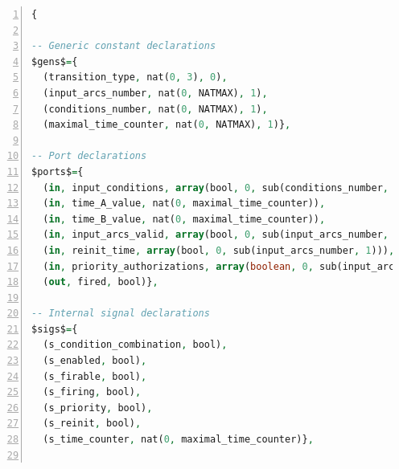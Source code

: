 \documentclass[pdflatex,sn-mathphys]{sn-jnl}%
\theoremstyle{thmstyleone}%
\theoremstyle{thmstyletwo}%
\theoremstyle{thmstylethree}%
\begin{document}
\begin{appendices}
\begin{lstlisting}[language=VHDL,
label={lst:trans-design-abss},
caption={The \texttt{transition} design in \hvhdl{} abstract syntax.},
framexleftmargin=1.5em,
xleftmargin=2em,
numbers=left,
numberstyle=\tiny\ttfamily,
basicstyle=\fontsize{8}{10}\selectfont]
{

-- Generic constant declarations
$gens$={
  (transition_type, nat(0, 3), 0),
  (input_arcs_number, nat(0, NATMAX), 1),
  (conditions_number, nat(0, NATMAX), 1),
  (maximal_time_counter, nat(0, NATMAX), 1)},

-- Port declarations
$ports$={
  (in, input_conditions, array(bool, 0, sub(conditions_number, 1)),
  (in, time_A_value, nat(0, maximal_time_counter)),
  (in, time_B_value, nat(0, maximal_time_counter)),
  (in, input_arcs_valid, array(bool, 0, sub(input_arcs_number, 1))),
  (in, reinit_time, array(bool, 0, sub(input_arcs_number, 1))),
  (in, priority_authorizations, array(boolean, 0, sub(input_arcs_number, 1))),
  (out, fired, bool)},

-- Internal signal declarations
$sigs$={
  (s_condition_combination, bool),
  (s_enabled, bool),
  (s_firable, bool),
  (s_firing, bool),
  (s_priority, bool),
  (s_reinit, bool),
  (s_time_counter, nat(0, maximal_time_counter)},


\end{lstlisting}
\end{appendices}
\end{document}
